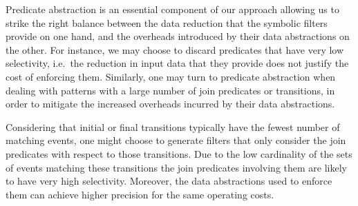 Predicate abstraction is an essential component of our approach
allowing us to strike the right balance between the data reduction that the
symbolic filters provide on one hand, and the overheads introduced by their
data abstractions on the other.
For instance, we may choose to discard
predicates that have very low selectivity, i.e.\ the reduction in input data
that they provide does not justify the cost of enforcing them.
Similarly, one may turn to predicate abstraction when dealing with patterns with
a large number of join predicates or transitions, in order to mitigate the
increased overheads incurred by their data abstractions.

Considering that initial or final transitions typically have the fewest
number of matching events, one might choose to generate filters that only
consider the join predicates with respect to those transitions.
Due to the low cardinality of the sets of events matching these transitions 
the join predicates involving them are likely to have very high selectivity.
Moreover, the data abstractions used to enforce them can achieve higher
precision for the same operating costs.












 
